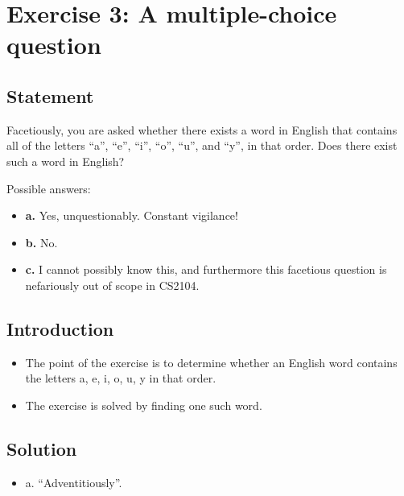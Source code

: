 \documentclass[12pt]{article}
\begin{document}

\newpage

\section{Exercise 3: A multiple-choice question}


\subsection{Statement}

Facetiously, you are asked whether there exists a word in English that contains
all of the letters ``a'', ``e'', ``i'', ``o'', ``u'', and ``y'', in that order.
Does there exist such a word in English?

Possible answers:

\begin{itemize}
\item \textbf{a.} Yes, unquestionably. Constant vigilance!
\item \textbf{b.} No.
\item \textbf{c.} I cannot possibly know this, and furthermore this facetious
  question is nefariously out of scope in CS2104.
\end{itemize}


\subsection{Introduction}

\begin{itemize}

\item
  The point of the exercise is to determine whether an English word contains the letters a, e, i, o, u, y in that order.

\item
  The exercise is solved by finding one such word.

\end{itemize}


\subsection{Solution}

\begin{itemize}
\item a. ``Adventitiously''.
\end{itemize}
\end{document}
